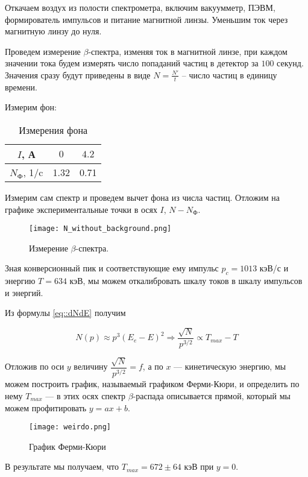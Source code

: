 Откачаем воздух из полости спектрометра, включим вакуумметр, ПЭВМ, формирователь
импульсов и питание магнитной линзы. Уменьшим ток через магнитную линзу до нуля.

Проведем измерение $\beta$-спектра, изменяя ток в магнитной линзе, при каждом
значении тока будем измерять число попаданий частиц в детектор за $100$ секунд.
Значения сразу будут приведены в виде $N = \frac{N'}{t}$ -- число частиц в
единицу времени.

Измерим фон:

\begin{table}[h!]
  \caption{Измерения фона}
  \begin{center}
    \begin{tabular}{| c | c | c |}
      \hline
      $I$, А & $0$ & $4.2$\\
      \hline
      $N_{\text{Ф}}$, 1/c & 1.32 & 0.71\\
      \hline
    \end{tabular}
  \end{center}
\end{table}

Измерим сам спектр и проведем вычет фона из числа частиц. Отложим на графике
экспериментальные точки в осях $I$, $N - N_{\text{Ф}}$.

\begin{figure}[h]
  \centering
  \texttt{[image: N\_without\_background.png]}
  \caption{Измерение $\beta$-спектра.}
  \label{img::N_without_background}
\end{figure}

Зная конверсионный пик и соответствующие ему импульс $ p_c = 1013 $ кэВ/с и
энергию $ T = 634 $ кэВ, мы можем откалибровать шкалу токов в шкалу импульсов и
энергий.

Из формулы \eqref{eq::dNdE} получим

\begin{equation}\label{}
  N(p) \approx p^3 (E_e - E)^2 \Rightarrow \dfrac{\sqrt{N}}{p^{3/2}} \propto T_{max} - T
\end{equation}

Отложив по оси $ y $ величину $ \dfrac{\sqrt{N}}{p^{3/2}} = f $, а по $ x $ ---
кинетическую энергию, мы можем построить график, называемый графиком Ферми-Кюри,
и определить по нему $ T_{max} $ --- в этих осях спектр $\beta$-распада
описывается прямой, который мы можем профитировать $ y = ax +b $.

\begin{figure}[h]
  \centering
  \texttt{[image: weirdo.png]}
  \caption{График Ферми-Кюри}
  \label{img::N_without_background}
\end{figure}

В результате мы получаем, что $T_{max} = 672 \pm 64$ кэВ при $y = 0$.